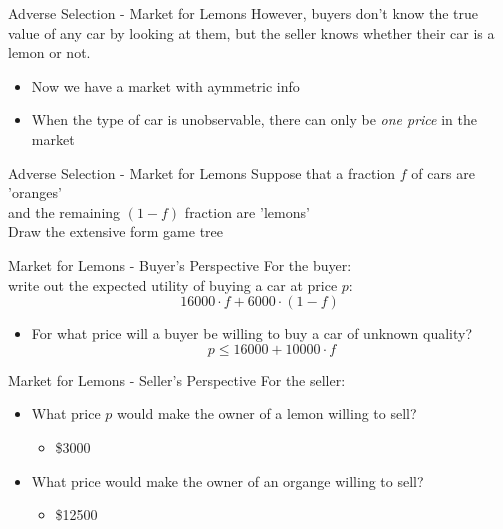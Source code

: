 
\begin{frame}{Adverse Selection - Market for Lemons}
  However, buyers don't know the true value of any car by looking at them,
  but the seller knows whether their car is a lemon or not.
  \begin{itemize}
    \item Now we have a market with \alert{aymmetric info}
    \item When the type of car is unobservable,
    there can only be \textit{one price} in the market
  \end{itemize}
\end{frame}


\begin{frame}{Adverse Selection - Market for Lemons}
   Suppose that a fraction $f$ of cars are 'oranges' \\ 
   and the remaining $(1-f)$ fraction are 'lemons' \\
   Draw the extensive form game tree
\end{frame}


\begin{frame}{Market for Lemons - Buyer's Perspective}
  For the buyer: \\ 
  write out the expected utility of buying a car at price $p$:
  \pause
  $$16000\cdot f + 6000 \cdot (1-f)$$
  \begin{itemize}
    \item For what price will a buyer be willing to buy a car of unknown quality?
    \pause
    $$p \leq 16000 + 10000\cdot f$$
  \end{itemize}
\end{frame}


\begin{frame}{Market for Lemons - Seller's Perspective}
  For the seller: \\ 
  \begin{itemize}
    \item What price $p$ would make the owner of a lemon willing to sell?
      \pause
      \begin{itemize}
        \item \$3000
      \end{itemize}
    \item What price would make the owner of an organge willing to sell?
      \pause
      \begin{itemize}
        \item \$12500
      \end{itemize}
  \end{itemize}
\end{frame}

